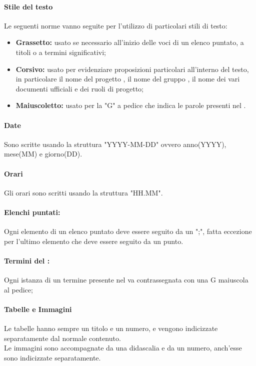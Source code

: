       \paragraph{Stile del testo}
      Le seguenti norme vanno seguite per l'utilizzo di particolari stili di testo:
      \begin{itemize}
        \item \textbf{Grassetto:} usato se necessario all'inizio delle voci di un elenco puntato, a titoli o a termini significativi;
        \item \textbf{Corsivo:} usato per evidenziare proposizioni particolari all'interno del testo, in particolare il nome del progetto \textit{\NomeProgetto}, il nome del gruppo \textit{\Gruppo{}}, il nome dei vari documenti ufficiali e dei ruoli di progetto;
        \item \textbf{Maiuscoletto:} usato per la "G" a pedice che indica le parole presenti nel \Glossario{}.
      \end{itemize}

      \paragraph{Date}
       Sono scritte usando la struttura "YYYY-MM-DD" ovvero anno(YYYY), mese(MM) e giorno(DD).
      \paragraph{Orari}
      Gli orari sono scritti usando la struttura "HH.MM".
      \paragraph{Elenchi puntati:}
      Ogni elemento di un elenco puntato deve essere seguito da un ";", fatta eccezione per l'ultimo elemento che deve essere seguito da un punto.
      \paragraph{Termini del \textit{\Glossario}:}
      Ogni istanza di un termine presente nel \Glossario{} va contrassegnata con una G maiuscola al pedice;
      \paragraph{Tabelle e Immagini}
      Le tabelle hanno sempre un titolo e un numero, e vengono indicizzate separatamente dal normale contenuto.\\
      Le immagini sono accompagnate da una didascalia e da un numero, anch'esse sono indicizzate separatamente.

